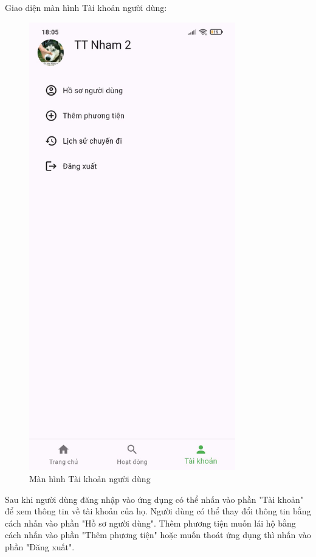 \documentclass[../DoAn.tex]{subfiles}
\begin{document}
Giao diện màn hình Tài khoản người dùng:
\begin{figure}[H]
    \centering
    \includegraphics[width=0.8\textwidth]{Hinhve/Tai_khoan_nguoi_dung.png}
    \caption{Màn hình Tài khoản người dùng}
    \label{fig:Tai_khoan_nguoi_dung}
\end{figure}

Sau khi người dùng đăng nhập vào ứng dụng có thể nhấn vào phần "Tài khoản" để xem thông tin về tài khoản của họ.
Người dùng có thể thay đổi thông tin bằng cách nhấn vào phần "Hồ sơ người dùng".
Thêm phương tiện muốn lái hộ bằng cách nhấn vào phần "Thêm phương tiện" hoặc muốn thoát ứng dụng thì nhấn vào phần "Đăng xuất".
\end{document}
